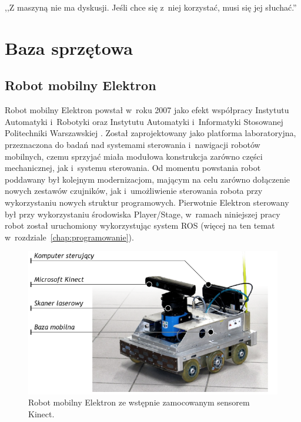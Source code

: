 

\begin{savequote}[70mm]
,,Z maszyną nie ma dyskusji. Jeśli chce się z~niej korzystać, musi się jej słuchać.''
\end{savequote}


\chapter{Baza sprzętowa}
\label{chap:sprzet}


\section{Robot mobilny Elektron}

Robot mobilny Elektron powstał w~roku 2007 jako efekt współpracy Instytutu Automatyki
i~Robotyki oraz Instytutu Automatyki i~Informatyki Stosowanej Politechniki Warszawskiej
\cite{SzynkiewiczEtal06}. Został zaprojektowany jako platforma laboratoryjna,
przeznaczona do badań nad systemami sterowania i~nawigacji robotów mobilnych,
czemu sprzyjać miała modułowa konstrukcja zarówno części mechanicznej, jak i~systemu
sterowania. Od momentu powstania robot poddawany był kolejnym modernizacjom,
mającym na celu zarówno dołączenie nowych zestawów czujników, jak i~umożliwienie
sterowania robota przy wykorzystaniu nowych struktur programowych. Pierwotnie Elektron
sterowany był przy wykorzystaniu środowiska Player/Stage, w~ramach niniejszej pracy
robot został uruchomiony wykorzystując system ROS (więcej na ten temat 
w~rozdziale~\ref{chap:programowanie}).


\begin{figure}[h!]
\centering
\includegraphics{../../Common/img/elektron/elektron_desc}
\caption[Robot mobilny Elektron]{Robot mobilny Elektron ze wstępnie zamocowanym
sensorem Kinect.}
\label{fig:elektron}
\end{figure}

